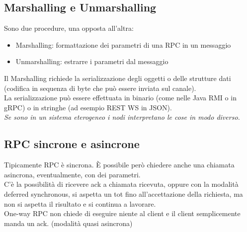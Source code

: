 \subsection{Marshalling e Unmarshalling}
Sono due procedure, una opposta all'altra:
\begin{itemize}
    \item Marshalling: formattazione dei parametri di una RPC in un messaggio
    \item Unmarshalling: estrarre i parametri dal messaggio
\end{itemize}
Il Marshalling richiede la serializzazione degli oggetti o delle strutture dati (codifica in sequenza di byte che può essere inviata sul canale).\\
La serializzazione può essere effettuata in binario (come nelle Java RMI o in gRPC) o in stringhe (ad esempio REST WS in JSON).\\

\textit{Se sono in un sistema eterogeneo i nodi interpretano le cose in modo diverso.}

\subsection{RPC sincrone e asincrone}
Tipicamente RPC è sincrona. È possibile però chiedere anche una chiamata asincrona, eventualmente, con dei parametri. \\
C'è la possibilità di ricevere ack a chiamata ricevuta, oppure con la modalità deferred synchronous, si aspetta un tot fino all'accettazione della richiesta, ma non si aspetta il risultato e si continua a lavorare. \\
One-way RPC non chiede di eseguire niente al client e il client semplicemente manda un ack. (modalità quasi asincrona)

